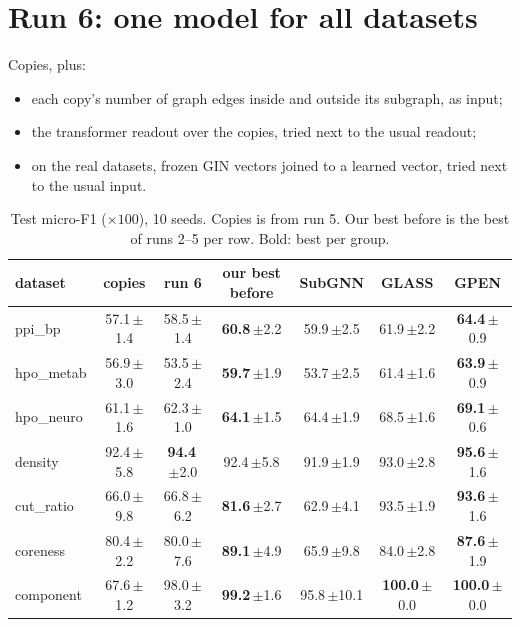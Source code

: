 \documentclass[11pt]{article}
\begin{document}
\section*{Run 6: one model for all datasets}

Copies, plus:
\begin{itemize}[itemsep=1pt]
  \item each copy's number of graph edges inside and outside its subgraph, as input;
  \item the transformer readout over the copies, tried next to the usual readout;
  \item on the real datasets, frozen GIN vectors joined to a learned vector, tried next to the usual input.
\end{itemize}

\begin{table}[H]
\centering
\footnotesize
\setlength{\tabcolsep}{3pt}
\begin{tabular}{lccc|ccc}
\toprule
dataset & copies & run 6 & our best before & SubGNN & GLASS & GPEN \\
\midrule
ppi\_bp    & 57.1\,{\scriptsize$\pm$1.4} & 58.5\,{\scriptsize$\pm$1.4} & \textbf{60.8}\,{\scriptsize$\pm$2.2} & 59.9\,{\scriptsize$\pm$2.5} & 61.9\,{\scriptsize$\pm$2.2} & \textbf{64.4}\,{\scriptsize$\pm$0.9} \\
hpo\_metab & 56.9\,{\scriptsize$\pm$3.0} & 53.5\,{\scriptsize$\pm$2.4} & \textbf{59.7}\,{\scriptsize$\pm$1.9} & 53.7\,{\scriptsize$\pm$2.5} & 61.4\,{\scriptsize$\pm$1.6} & \textbf{63.9}\,{\scriptsize$\pm$0.9} \\
hpo\_neuro & 61.1\,{\scriptsize$\pm$1.6} & 62.3\,{\scriptsize$\pm$1.0} & \textbf{64.1}\,{\scriptsize$\pm$1.5} & 64.4\,{\scriptsize$\pm$1.9} & 68.5\,{\scriptsize$\pm$1.6} & \textbf{69.1}\,{\scriptsize$\pm$0.6} \\
density    & 92.4\,{\scriptsize$\pm$5.8} & \textbf{94.4}\,{\scriptsize$\pm$2.0} & 92.4\,{\scriptsize$\pm$5.8} & 91.9\,{\scriptsize$\pm$1.9} & 93.0\,{\scriptsize$\pm$2.8} & \textbf{95.6}\,{\scriptsize$\pm$1.6} \\
cut\_ratio & 66.0\,{\scriptsize$\pm$9.8} & 66.8\,{\scriptsize$\pm$6.2} & \textbf{81.6}\,{\scriptsize$\pm$2.7} & 62.9\,{\scriptsize$\pm$4.1} & 93.5\,{\scriptsize$\pm$1.9} & \textbf{93.6}\,{\scriptsize$\pm$1.6} \\
coreness   & 80.4\,{\scriptsize$\pm$2.2} & 80.0\,{\scriptsize$\pm$7.6} & \textbf{89.1}\,{\scriptsize$\pm$4.9} & 65.9\,{\scriptsize$\pm$9.8} & 84.0\,{\scriptsize$\pm$2.8} & \textbf{87.6}\,{\scriptsize$\pm$1.9} \\
component  & 67.6\,{\scriptsize$\pm$1.2} & 98.0\,{\scriptsize$\pm$3.2} & \textbf{99.2}\,{\scriptsize$\pm$1.6} & 95.8\,{\scriptsize$\pm$10.1} & \textbf{100.0}\,{\scriptsize$\pm$0.0} & \textbf{100.0}\,{\scriptsize$\pm$0.0} \\
\bottomrule
\end{tabular}
\caption{Test micro-F1 ($\times 100$), 10 seeds. Copies is from run 5. Our best before is the best of runs 2--5 per row. Bold: best per group.}
\label{tab:run6}
\end{table}
\end{document}
